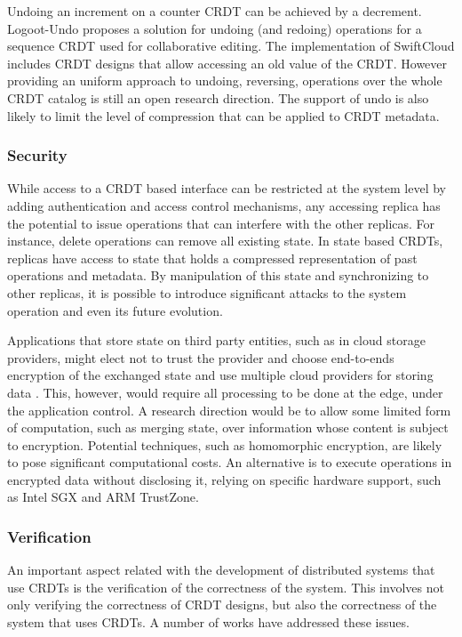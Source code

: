 \documentclass[11pt,a4paper]{article}
\begin{document}
Undoing an increment on a counter CRDT can be achieved by a decrement. 
Logoot-Undo \cite{Weiss10LogootUndo} proposes a solution for undoing (and redoing) 
operations for a sequence CRDT used for collaborative editing.
The implementation of SwiftCloud \cite{swiftcloud} includes
CRDT designs that allow accessing an old value of the CRDT.   
However providing an uniform approach to undoing, reversing, operations over 
the whole CRDT catalog is still an open research direction. 
The support of undo is also likely to limit the level of compression that 
can be applied to CRDT metadata. 


\subsubsection{Security}
While access to a CRDT based interface can be restricted at the system level by 
adding authentication and access control mechanisms, 
any accessing replica has the potential to issue operations that can interfere 
with the other replicas. 
For instance, delete operations can remove all existing state. 
In state based CRDTs, replicas have access to state that holds a 
compressed representation of past operations and metadata. 
By manipulation of this state and synchronizing to other replicas, 
it is possible to introduce significant attacks to the system operation 
and even its future evolution. 

Applications that store state on third party entities, such as in 
cloud storage providers, might elect not to trust the provider and 
choose end-to-ends encryption of the exchanged state and use
multiple cloud providers for storing data \cite{depsky}. 
This, however, would require all processing to be done at the edge, 
under the application control. 
A research direction would be to allow some limited form of computation, 
such as merging state, over information whose content is subject to encryption. 
Potential techniques, such as homomorphic encryption, are likely to 
pose significant computational costs. 
An alternative is to execute operations in encrypted data without disclosing it, 
relying on specific hardware support, such as Intel SGX and ARM TrustZone.

\subsubsection{Verification}

An important aspect related with the development of distributed systems that 
use CRDTs is the verification of the correctness of the system. 
This involves not only verifying the correctness of CRDT designs, but also 
the correctness of the system that uses CRDTs. A number of works have addressed 
these issues. 
\end{document}
